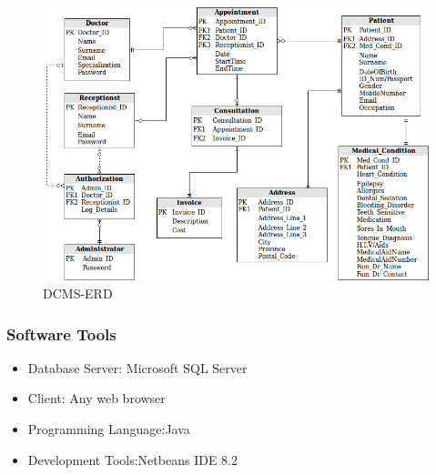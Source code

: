 \documentclass[12pt]{article}
\begin{document}
    \begin{figure}[h]
    \centering
    
    \includegraphics[width=\linewidth]{Dentist ERD.png}
    \caption{DCMS-ERD}
    \label{fig:ERD}
    \end{figure}
    
    \subsubsection{Software Tools}
    \begin{itemize}
    \item
     Database Server: Microsoft SQL Server
    \item
     Client: Any web browser
     \item
     Programming Language:Java
     \item
     Development Tools:Netbeans IDE 8.2
    \end{itemize}
    
\end{document}
